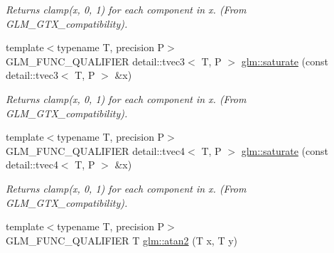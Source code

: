 \begin{CompactItemize}
\begin{CompactList}\small\item\em Returns clamp(x, 0, 1) for each component in x. (From GLM\_\-GTX\_\-compatibility). \item\end{CompactList}\item 
\hypertarget{group__gtx__compatibility_g6bed80346304d4f33d4256e8abec587e}{
{\footnotesize template$<$typename T, precision P$>$ }\\GLM\_\-FUNC\_\-QUALIFIER detail::tvec3$<$ T, P $>$ \hyperlink{group__gtx__compatibility_g6bed80346304d4f33d4256e8abec587e}{glm::saturate} (const detail::tvec3$<$ T, P $>$ \&x)}
\label{group__gtx__compatibility_g6bed80346304d4f33d4256e8abec587e}

\begin{CompactList}\small\item\em Returns clamp(x, 0, 1) for each component in x. (From GLM\_\-GTX\_\-compatibility). \item\end{CompactList}\item 
\hypertarget{group__gtx__compatibility_ga2254fc526cccf472503dbf68844de77}{
{\footnotesize template$<$typename T, precision P$>$ }\\GLM\_\-FUNC\_\-QUALIFIER detail::tvec4$<$ T, P $>$ \hyperlink{group__gtx__compatibility_ga2254fc526cccf472503dbf68844de77}{glm::saturate} (const detail::tvec4$<$ T, P $>$ \&x)}
\label{group__gtx__compatibility_ga2254fc526cccf472503dbf68844de77}

\begin{CompactList}\small\item\em Returns clamp(x, 0, 1) for each component in x. (From GLM\_\-GTX\_\-compatibility). \item\end{CompactList}\item 
\hypertarget{group__gtx__compatibility_g7af1203c97febe3c07958178aead3788}{
{\footnotesize template$<$typename T, precision P$>$ }\\GLM\_\-FUNC\_\-QUALIFIER T \hyperlink{group__gtx__compatibility_g7af1203c97febe3c07958178aead3788}{glm::atan2} (T x, T y)}
\label{group__gtx__compatibility_g7af1203c97febe3c07958178aead3788}


\end{CompactItemize}
